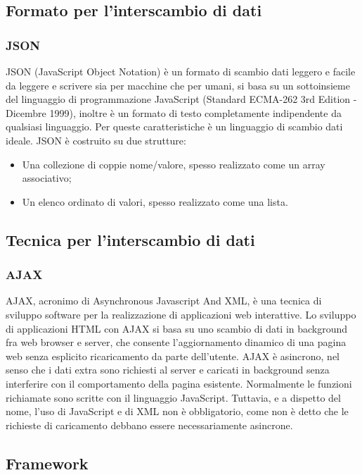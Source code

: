 \subsection{Formato per l’interscambio di dati}
\subsubsection{JSON}
JSON (JavaScript Object Notation) è un formato di scambio dati leggero e facile
da leggere e scrivere sia per macchine che per umani, si basa su un sottoinsieme del
linguaggio di programmazione JavaScript (Standard ECMA-262 3rd Edition - Dicembre
1999), inoltre è un formato di testo completamente indipendente da qualsiasi linguaggio.
Per queste caratteristiche è un linguaggio di scambio dati ideale. JSON è costruito su
due strutture:
\begin{itemize}
\item Una collezione di coppie nome/valore, spesso realizzato come un array associativo;
\item Un elenco ordinato di valori, spesso realizzato come una lista.
\end{itemize}
\subsection{Tecnica per l’interscambio di dati}
\subsubsection{AJAX}
AJAX, acronimo di Asynchronous Javascript And XML, è una tecnica di sviluppo
software per la realizzazione di applicazioni web interattive.
Lo sviluppo di applicazioni HTML con AJAX si basa su uno scambio di dati in
background fra web browser e server, che consente l’aggiornamento dinamico di una
pagina web senza esplicito ricaricamento da parte dell’utente.
AJAX è asincrono, nel senso che i dati extra sono richiesti al server e caricati in
background senza interferire con il comportamento della pagina esistente. Normalmente
le funzioni richiamate sono scritte con il linguaggio JavaScript. Tuttavia, e a dispetto
del nome, l’uso di JavaScript e di XML non è obbligatorio, come non è detto che le
richieste di caricamento debbano essere necessariamente asincrone.
\subsection{Framework}
